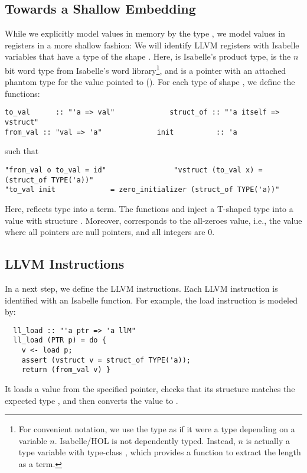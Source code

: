 \documentclass[a4paper,oribibl,envcountsame]{llncs}
\begin{document}
\subsection{Towards a Shallow Embedding}
While we explicitly model values in memory by the type , we model values in registers in a more shallow fashion:
We will identify LLVM registers with Isabelle variables that have a type of the shape . 
Here, \q{\is{\x}} is Isabelle's product type,  is the $n$ bit word type from Isabelle's word 
library\cprotect\footnote{For convenient notation, we use the type  as if it were a type depending on a variable $n$. 
Isabelle/HOL is not dependently typed. Instead, $n$ is actually a type variable with type-class , which provides a 
function  to extract the length as a term.}, 
and  is a pointer with an attached phantom type for the value pointed to ().
%
For each type  of shape , we define the functions:
\begin{lstlisting}
to_val      :: "'a => val"             struct_of :: "'a itself => vstruct"
from_val :: "val => 'a"             init          :: 'a
\end{lstlisting}
such that
\begin{lstlisting}
"from_val o to_val = id"                "vstruct (to_val x) = (struct_of TYPE('a))"
"to_val init             = zero_initializer (struct_of TYPE('a))"
\end{lstlisting}
Here,  reflects type  into a term.
The functions  and  inject a T-shaped type  into a value with structure .
Moreover,  corresponds to the all-zeroes value, i.e., the value where all pointers are null pointers, and all integers are $0$.

\subsection{LLVM Instructions}
In a next step, we define the LLVM instructions. Each LLVM instruction is identified with an Isabelle function. For example, the load instruction
is modeled by:
\begin{lstlisting}
  ll_load :: "'a ptr => 'a llM"
  ll_load (PTR p) = do {
    v <- load p;
    assert (vstruct v = struct_of TYPE('a));
    return (from_val v) }
\end{lstlisting}
It loads a value from the specified pointer, checks that its structure matches the expected type , and then 
converts the value to . 
\end{document}
